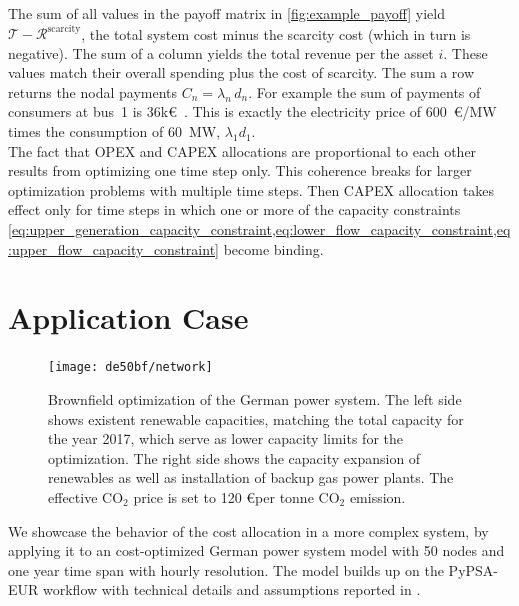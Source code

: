\documentclass[11pt,twocolumn]{article}
\newcommand{\kk}{k\euro~}
\newcommand{\totalcost}{\mathcal{T}}
\newcommand{\remainingcost}{\mathcal{R}}
\newcommand{\scarcitycost}{\remainingcost^\text{scarcity}}
\begin{document}
% 
The sum of all values in the payoff matrix in \cref{fig:example_payoff} yield $\totalcost - \scarcitycost$, the total system cost minus the scarcity cost (which in turn is negative).
The sum of a column  yields the total revenue per the asset $i$. These values match their overall spending plus the cost of scarcity. The sum a row returns the nodal payments $C_n = \lambda_n \, d_n$. For example the sum of payments of consumers at bus~1 is 36\kk. This is exactly the electricity price of 600~\euro/MW times the consumption of 60~MW, $\lambda_1 d_1$. \\
% 

The fact that OPEX and CAPEX allocations are proportional to each other results from optimizing one time step only. This coherence breaks for larger optimization problems with multiple time steps. Then CAPEX allocation takes effect only for time steps in which one or more of the capacity constraints  \cref{eq:upper_generation_capacity_constraint,eq:lower_flow_capacity_constraint,eq:upper_flow_capacity_constraint} become binding.  \\



\section{Application Case}
% 
\begin{figure}[t]
    \centering
    \texttt{[image: de50bf/network]}
    \caption{Brownfield optimization of the German power system. The left side shows existent renewable capacities, matching the total capacity for the year 2017, which serve as lower capacity limits for the optimization. The right side shows the capacity expansion of renewables as well as installation of backup gas power plants. The effective CO$_2$ price is set to 120 \euro per tonne CO$_2$ emission.}
    \label{fig:network}
\end{figure}
% 
We showcase the behavior of the cost allocation in a more complex system, by applying it to an cost-optimized German power system model with 50 nodes and one year time span with hourly resolution. The model builds up on the PyPSA-EUR workflow \cite{horsch_jonas_pypsa-eur_2020} with technical details and assumptions reported in \cite{horsch_pypsa-eur_2018}. 
\end{document}
